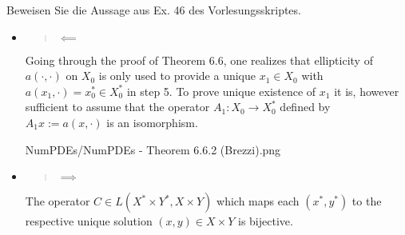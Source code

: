 
\begin{exercise}

Beweisen Sie die Aussage aus Ex. 46 des Vorlesungsskriptes.


\end{exercise}


\begin{solution}

\phantom{}

\begin{itemize}
  
  \item \blockquote{$\impliedby$}:
  
  Going through the proof of Theorem 6.6, one realizes that ellipticity of $a(\cdot, \cdot)$ on $X_0$ is only used to provide a unique $x_1 \in X_0$ with $a(x_1, \cdot) = x_0^\ast \in X_0^\ast$ in step 5.
  To prove unique existence of $x_1$ it is, however sufficient to assume that the operator $A_1: X_0 \to X_0^\ast$ defined by $A_1 x := a(x, \cdot)$ is an isomorphism.

  {NumPDEs/NumPDEs - Theorem 6.6.2 (Brezzi).png}

  \begin{comment}

    In the proof of Theorem 6.6 the ellipticity of $a(\cdot, \cdot)$ on $X_0$ is only used to provide a unique $x_1 \in X_0$ with $a(x_1, \cdot) = x^\ast - a(x_2, \cdot) \in X_0^\ast$ in Step 5.
    Replacing the assumption for $a$ in Theorem 6.6 with our assumptions, we first obtain that $A_1: X_0 \to X_0^\ast$ is an isomorphism.
    With that we can conclude again, that there is an unique $x_1 \in X_0$ with $a(x_1, \cdot) = x^\ast - a(x_2, \cdot) \in X_0^\ast$.

  \end{comment}

  \item \blockquote{$\implies$}:

  The operator $C \in L(X^\ast \times Y^\ast, X \times Y)$ which maps each $(x^\ast, y^\ast)$ to the respective unique solution $(x, y) \in X \times Y$ is bijective.


\end{itemize}
\end{solution}
